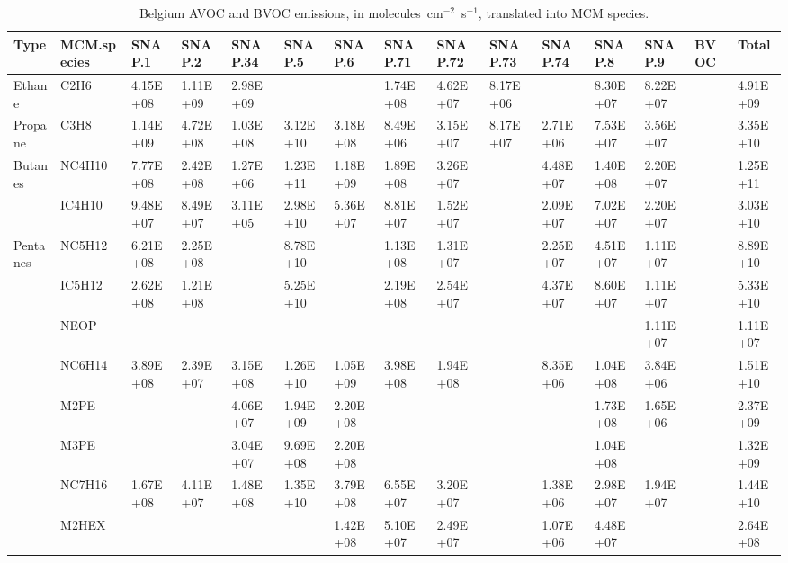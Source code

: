 \tiny
\begin{longtable}{lllllllllllllll}
	\caption{Belgium AVOC and BVOC emissions, in molecules~cm$^{-2}$~s$^{-1}$, translated into MCM species.}\\%
	\hline \hline
	\textbf{Type} & \textbf{MCM.species} & \textbf{SNAP.1} & \textbf{SNAP.2} & \textbf{SNAP.34} & \textbf{SNAP.5} & \textbf{SNAP.6} & \textbf{SNAP.71} & \textbf{SNAP.72} & \textbf{SNAP.73} & \textbf{SNAP.74} & \textbf{SNAP.8} & \textbf{SNAP.9} & \textbf{BVOC} & \textbf{Total}\\
	\endhead
	\hline
	Ethane & C2H6 & 4.15E+08 & 1.11E+09 & 2.98E+09 &  &  & 1.74E+08 & 4.62E+07 & 8.17E+06 &  & 8.30E+07 & 8.22E+07 &  & 4.91E+09 \\
	\hline Propane & C3H8 & 1.14E+09 & 4.72E+08 & 1.03E+08 & 3.12E+10 & 3.18E+08 & 8.49E+06 & 3.15E+07 & 8.17E+07 & 2.71E+06 & 7.53E+07 & 3.56E+07 &  & 3.35E+10 \\ \hline
	\multirow{2}{*}{Butanes} & NC4H10 & 7.77E+08 & 2.42E+08 & 1.27E+06 & 1.23E+11 & 1.18E+09 & 1.89E+08 & 3.26E+07 &  & 4.48E+07 & 1.40E+08 & 2.20E+07 &  & 1.25E+11 \\
	 & IC4H10 & 9.48E+07 & 8.49E+07 & 3.11E+05 & 2.98E+10 & 5.36E+07 & 8.81E+07 & 1.52E+07 &  & 2.09E+07 & 7.02E+07 & 2.20E+07 &  & 3.03E+10 \\
	\hline \multirow{3}{*}{Pentanes} & NC5H12 & 6.21E+08 & 2.25E+08 &  & 8.78E+10 &  & 1.13E+08 & 1.31E+07 &  & 2.25E+07 & 4.51E+07 & 1.11E+07 &  & 8.89E+10 \\
	 & IC5H12 & 2.62E+08 & 1.21E+08 &  & 5.25E+10 &  & 2.19E+08 & 2.54E+07 &  & 4.37E+07 & 8.60E+07 & 1.11E+07 &  & 5.33E+10 \\
	 & NEOP &  &  &  &  &  &  &  &  &  &  & 1.11E+07 &  & 1.11E+07 \\
	\hline \parbox[t]{2mm}{} & NC6H14 & 3.89E+08 & 2.39E+07 & 3.15E+08 & 1.26E+10 & 1.05E+09 & 3.98E+08 & 1.94E+08 &  & 8.35E+06 & 1.04E+08 & 3.84E+06 &  & 1.51E+10 \\
	 & M2PE &  &  & 4.06E+07 & 1.94E+09 & 2.20E+08 &  &  &  &  & 1.73E+08 & 1.65E+06 &  & 2.37E+09 \\
	 & M3PE &  &  & 3.04E+07 & 9.69E+08 & 2.20E+08 &  &  &  &  & 1.04E+08 &  &  & 1.32E+09 \\
	 & NC7H16 & 1.67E+08 & 4.11E+07 & 1.48E+08 & 1.35E+10 & 3.79E+08 & 6.55E+07 & 3.20E+07 &  & 1.38E+06 & 2.98E+07 & 1.94E+07 &  & 1.44E+10 \\
	 & M2HEX &  &  &  &  & 1.42E+08 & 5.10E+07 & 2.49E+07 &  & 1.07E+06 & 4.48E+07 &  &  & 2.64E+08 \\

\end{longtable}
